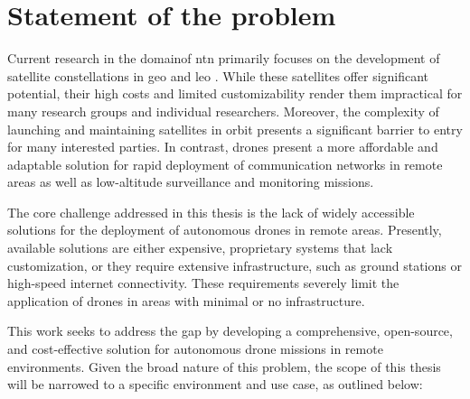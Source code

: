 \chapter{Statement of the problem}
\label{ch:statement_of_problem}

Current research in the domainof \gls{ntn} primarily focuses on the development of satellite constellations in \gls{geo} and \gls{leo} \autocite{non_terrestial_networks_trends}. While these satellites offer significant potential, their high costs and limited customizability render them impractical for many research groups and individual researchers. Moreover, the complexity of launching and maintaining satellites in orbit presents a significant barrier to entry for many interested parties. In contrast, drones present a more affordable and adaptable solution for rapid deployment of communication networks in remote areas as well as low-altitude surveillance and monitoring missions.

The core challenge addressed in this thesis is the lack of widely accessible solutions for the deployment of autonomous drones in remote areas. Presently, available solutions are either expensive, proprietary systems that lack customization, or they require extensive infrastructure, such as ground stations or high-speed internet connectivity. These requirements severely limit the application of drones in areas with minimal or no infrastructure.

This work seeks to address the gap by developing a comprehensive, open-source, and cost-effective solution for autonomous drone missions in remote environments. Given the broad nature of this problem, the scope of this thesis will be narrowed to a specific environment and use case, as outlined below:


